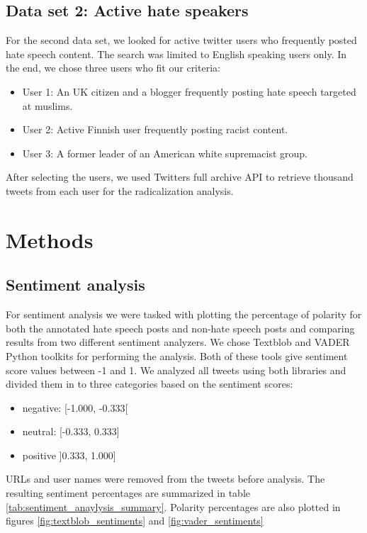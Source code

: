 \documentclass[conference]{IEEEtran}
\begin{document}
\subsection{Data set 2: Active hate speakers}
For the second data set, we looked for active twitter users who frequently posted hate speech content. 
The search was limited to English speaking users only. In the end, we chose three users who fit our 
criteria: 
\begin{itemize}
    \item User 1: An UK citizen and a blogger frequently posting hate speech targeted at muslims.
    \item User 2: Active Finnish user frequently posting racist content.
    \item User 3: A former leader of an American white supremacist group.
\end{itemize}
After selecting the users, we used Twitters full archive API to retrieve thousand tweets from each user for the
radicalization analysis. 
\section{Methods}
\subsection{Sentiment analysis}
For sentiment analysis we were tasked with plotting the percentage of polarity for both the 
annotated hate speech posts and non-hate speech posts and comparing results from two different 
sentiment analyzers. We chose Textblob \cite{python:textblob} and VADER \cite{hutto2014vader,python:vader} Python toolkits for performing the analysis. 
Both of these tools give sentiment score values between -1 and 1. We analyzed all tweets using
both libraries and divided them in to three categories based on the sentiment scores: 

\begin{itemize}
  \item negative:   [-1.000, -0.333[
  \item neutral:    [-0.333,  0.333]
  \item positive    ]0.333, 1.000] 
\end{itemize}

URLs and user names were removed from the tweets before analysis. The resulting sentiment 
percentages are summarized in table \ref{tab:sentiment_anaylysis_summary}. Polarity percentages 
are also plotted in figures \ref{fig:textblob_sentiments} and \ref{fig:vader_sentiments}
\end{document}
